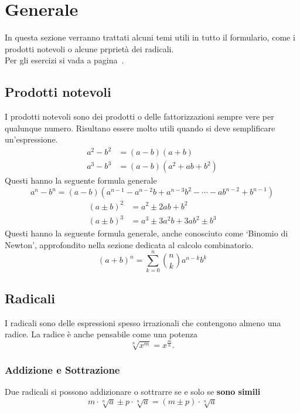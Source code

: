 
\section{Generale}\label{sec:gen}
In questa sezione verranno trattati alcuni temi utili in tutto il formulario, come i prodotti notevoli
o alcune prprietà dei radicali.\\
Per gli esercizi si vada a pagina~\pageref{ex:generale}.

\subsection{Prodotti notevoli}\label{subsec:gen:prodnot}
I prodotti notevoli sono dei prodotti o delle fattorizzazioni sempre vere per qualunque numero. 
Risultano essere molto utili quando si deve semplificare un'espressione.
\begin{align*}
  a^2 - b^2 &= (a-b)(a+b)\\
  a^3 - b^3 &= (a-b)(a^2+ab+b^2)
\end{align*}
Questi hanno la seguente formula generale
\begin{equation*}
  a^n - b^n = (a-b)(a^{n-1} - a^{n-2}b + a^{n-3}b^2 - \dotsb - ab^{n-2} + b^{n-1})
\end{equation*}
\begin{align*}
  (a\pm b)^2 &= a^2 \pm 2ab + b^2 \\
  (a\pm b)^3 &= a^3 \pm 3a^2b + 3ab^2 \pm b^3
\end{align*}
Questi hanno la seguente formula generale, anche conosciuto come `Binomio di Newton', approfondito
nella sezione dedicata al calcolo combinatorio.
\begin{equation*}
  (a + b)^n = \sum\limits_{k = 0}^{n}\binom{n}{k}a^{n-k}b^k
\end{equation*}

\subsection{Radicali}
I radicali sono delle espressioni spesso irrazionali che contengono almeno una radice. La radice è 
anche pensabile come una potenza
\begin{equation*}
  \sqrt[n]{x^m} = x^{\frac{m}{n}}.
\end{equation*}

\subsubsection{Addizione e Sottrazione}
Due radicali si possono addizionare o sottrarre se e solo se \textbf{sono simili}
\begin{equation*}
  m\cdot\sqrt[n]{a} \pm p\cdot\sqrt[n]{a} = (m\pm p)\cdot\sqrt[n]{a}
\end{equation*}

